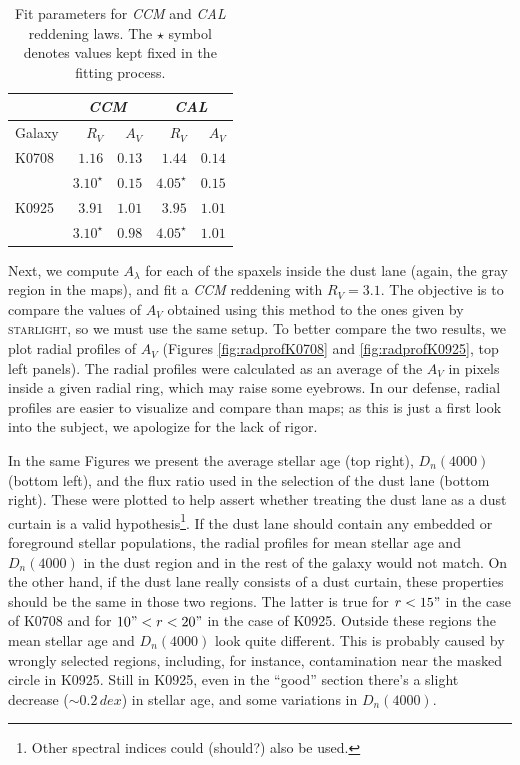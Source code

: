\documentclass[a4paper]{article}
\def\starlight{\textsc{starlight}\xspace}
\def\CCM{\textit{CCM}\xspace}
\def\CAL{\textit{CAL}\xspace}
\begin{document}
\begin{table}
\caption{Fit parameters for \CCM and \CAL reddening laws. The $\star$ symbol
denotes values kept fixed in the fitting process.}
\label{tab:params}
\begin{center}
\begin{tabular}{l | r r | r r}
\hline
       & \multicolumn{2}{c}{\CCM} & \multicolumn{2}{c}{\CAL} \\
\hline
Galaxy & $R_V$        & $A_V$           & $R_V$        & $A_V$  \\
\hline
K0708  & $1.16$       & $0.13$          & $1.44$       & $0.14$ \\
       & $3.10^\star$ & $0.15$          & $4.05^\star$ & $0.15$ \\
K0925  & $3.91$       & $1.01$          & $3.95$       & $1.01$ \\
       & $3.10^\star$ & $0.98$          & $4.05^\star$ & $1.01$ \\
\hline
\end{tabular}
\end{center}
\end{table}

Next, we compute $A_\lambda$ for each of the spaxels inside the dust lane
(again, the gray region in the maps), and fit a \CCM reddening with $R_V = 3.1$.
The objective is to compare the values of $A_V$ obtained using this method to
the ones given by \starlight, so we must use the same setup. To better compare
the two results, we plot radial profiles of $A_V$ (Figures
\ref{fig:radprofK0708} and \ref{fig:radprofK0925}, top left panels). The radial
profiles were calculated as an average of the $A_V$ in pixels inside a given
radial ring, which may raise some eyebrows. In our defense, radial profiles are
easier to visualize and compare than maps; as this is just a first look into the
subject, we apologize for the lack of rigor.

In the same Figures we present the average stellar age (top right), $D_n(4000)$
(bottom left), and the flux ratio used in the selection of the dust lane (bottom
right). These were plotted to help assert whether treating the dust lane as a
dust curtain is a valid hypothesis\footnote{Other spectral indices could
(should?) also be used.}. If the dust lane should contain any embedded or
foreground stellar populations, the radial profiles for mean stellar age and
$D_n(4000)$ in the dust region and in the rest of the galaxy would not match. On
the other hand, if the dust lane really consists of a dust curtain, these
properties should be the same in those two regions. The latter is true for $r <
15"$ in the case of K0708 and for $10" < r < 20"$ in the case of K0925. Outside
these regions the mean stellar age and $D_n(4000)$ look quite different. This is
probably caused by wrongly selected regions, including, for instance,
contamination near the masked circle in K0925. Still in K0925, even in the
``good'' section there's a slight decrease ($\sim 0.2\,dex$) in stellar age, and
some variations in $D_n(4000)$.
\end{document}
